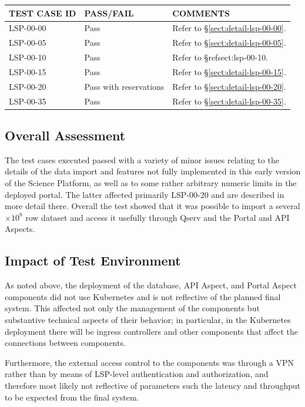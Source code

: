 \documentclass[DM,lsstdraft,STR,toc]{lsstdoc}
\begin{document}
\begin{longtable} {|p{}|p{}|p{}|}\hline
{\bf TEST CASE ID} & {\bf PASS/FAIL} & {\bf COMMENTS} \\\hline
LSP-00-00 & Pass & Refer to \S\ref{sect:detail-lsp-00-00}. \\\hline
LSP-00-05 & Pass & Refer to \S\ref{sect:detail-lsp-00-05}. \\\hline
LSP-00-10 & Pass & Refer to \S ref{sect:lsp-00-10}. \\\hline
LSP-00-15 & Pass & Refer to \S\ref{sect:detail-lsp-00-15}. \\\hline
LSP-00-20 & Pass with reservations & Refer to \S\ref{sect:detail-lsp-00-20}. \\\hline
LSP-00-35 & Pass & Refer to \S\ref{sect:detail-lsp-00-35}. \\\hline
\end{longtable}

\subsection{Overall Assessment}
\label{sect:overallassessment}

The test cases executed passed with a variety of minor issues relating to the details of the data import and features not fully implemented in this early version of the Science Platform,
as well as to some rather arbitrary numeric limits in the deployed portal.
The latter affected primarily LSP-00-20 and are described in more detail there.
Overall the test showed that it was possible to import a several $\times 10^8$ row dataset and access it usefully through Qserv and the Portal and API Aspects.

\subsection{Impact of Test Environment}
\label{sect:impact}

As noted above, the deployment of the database, API Aspect, and Portal Aspect components did not use Kubernetes and is not reflective of the planned final system.
This affected not only the management of the components but substantive technical aspects of their behavior;
in particular, in the Kubernetes deployment there will be ingress controllers and other components that affect the connections between components.

Furthermore, the external access control to the components was through a VPN rather than by means of LSP-level authentication and authorization,
and therefore most likely not reflective of parameters such the latency and throughput to be expected from the final system.
\end{document}
